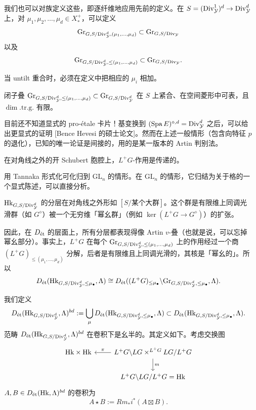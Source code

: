 我们也可以对族定义这些，即逐纤维地应用先前的定义。在 $S=(\Div^1_{\cY})^d\to\Div^d_{\cY}$ 上，对 $\mu_1,\mu_2,\ldots,\mu_d\in X^+_*$，可以定义
\[
\Gr_{G,S/\Div^d_{\cY},(\mu_1,\ldots,\mu_d)}\subset\Gr_{G,S/\Div_{\cY}}
\]
以及
\[
\Gr_{G,S/\Div^d_{\cY},\le(\mu_1,\ldots,\mu_d)}\subset\Gr_{G,S/\Div_{\cY}}.
\]

\begin{warning}
当 untilt 重合时，必须在定义中把相应的 $\mu_i$ 相加。
\end{warning}

\begin{proposition}[{[Berk]}]
闭子叠 $\Gr_{G,S/\Div^d_{\cY},\le(\mu_1,\ldots,\mu_d)}\subset\Gr_{G,S/\Div^d_{\cY}}$ 在 $S$ 上紧合、在空间菱形中可表，且 $\dim.\mathrm{tr.g.}$ 有限。
\end{proposition}

\begin{remark}
目前还不知道显式的 pro-étale 卡片！基变换到 $(\Spa E)^{\diamond,d}=\Div^d_{\cY}$ 之后，可以给出更显式的证明 [Bence Hevesi 的硕士论文]。然而在上述一般情形（包含向特征 $p$ 的退化），已知的唯一论证是间接的，用的是某一版本的 Artin 判别法。
\end{remark}


\begin{proposition}
在对角线之外的开 Schubert 胞腔上，$L^+G$-作用是传递的。
\end{proposition}

用 Tannaka 形式化可化归到 $\mathrm{GL}_n$ 的情形。在 $\mathrm{GL}_n$ 的情形，它归结为关于格的一个显式陈述，可以直接分析。

\begin{corollary}
$\mathrm{Hk}_{G,S/\Div^d_{\cY}}$ 的分层在对角线之外形如 $[S/\text{某个大群}]$。这个群是有限维上同调光滑群（如 $G^\diamond$）被一个无穷维「幂幺群」（例如 $\ker(L^+G\to G^\diamond)$）的扩张。

因此，在 $D_{\et}$ 的层面上，所有分层都表现得像 Artin $v$-叠（也就是说，可以忘掉幂幺部分）。事实上，$L^+G$ 在每个 $\Gr_{G,S/\Div^d_{\cY},\le(\mu_1,\ldots,\mu_d)}$ 上的作用经过一个商 $(L^+G)_{\le(\mu_1,\ldots,\mu_d)}$ 分解，后者是有限维且上同调光滑的，其核是「幂幺的」。所以
\[
D_{\et}(\mathrm{Hk}_{G,S/\Div^d_{\cY},\le\mu_\bullet},\Lambda)\cong D_{\et}((L^+G)_{\le\mu_\bullet}\backslash\Gr_{G,S/\Div^d_{\cY},\le\mu_\bullet},\Lambda).
\]
\end{corollary}

\begin{definition}
我们定义
\[
D_{\et}(\mathrm{Hk}_{G,S/\Div^d_{\cY}},\Lambda)^{bd}:=\bigcup_\mu D_{\et}(\mathrm{Hk}_{G,S/\Div^d_{\cY},\le\mu_\bullet},\Lambda)\subset D_{\et}(\mathrm{Hk}_{G,S/\Div^d_{\cY},\le\mu_\bullet},\Lambda).
\]
范畴 $D_{\et}(\mathrm{Hk}_{G,S/\Div^d_{\cY}},\Lambda)^{bd}$ 在卷积下是幺半的。其定义如下。考虑交换图
\[
\begin{tikzcd}
\mathrm{Hk}\times\mathrm{Hk} & L^+G\backslash LG\times^{L^+G}LG/L^+G \arrow[l,"\pi"'] \arrow[d,"m"] \\
& L^+G\backslash LG/L^+G=\mathrm{Hk}
\end{tikzcd}
\]
$A,B\in D_{\et}(\mathrm{Hk},\Lambda)^{bd}$ 的卷积为
\[
A\star B:=Rm_*i^*(A\boxtimes B).
\]
\end{definition}


